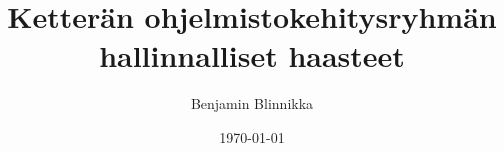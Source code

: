 \documentclass[finnish,twoside,censored,tkt]{HYthesisML}
\title{Ketterän ohjelmistokehitysryhmän hallinnalliset haasteet}
\author{Benjamin Blinnikka}
\date{\today}
\begin{document}
\maketitle




\mytableofcontents

\mainmatter








{}  %
\printbibliography

\backmatter
\begin{appendices}


%

\end{appendices}
\end{document}
